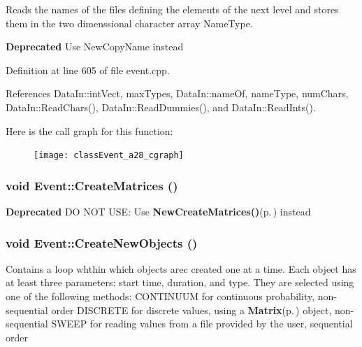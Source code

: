 Reads the names of the files defining the elements of the next level and stores them in the two dimenssional character array Name\-Type. 

\begin{Desc}
\item[{\bf Deprecated}]Use New\-Copy\-Name instead \end{Desc}


Definition at line 605 of file event.cpp.

References Data\-In::int\-Vect, max\-Types, Data\-In::name\-Of, name\-Type, num\-Chars, Data\-In::Read\-Chars(), Data\-In::Read\-Dummies(), and Data\-In::Read\-Ints().

Here is the call graph for this function:\begin{figure}[H]
\begin{center}
\leavevmode
\texttt{[image: classEvent\_a28\_cgraph]}
\end{center}
\end{figure}
\subsubsection{\setlength{\rightskip}{0pt plus 5cm}void Event::Create\-Matrices ()}\label{classEvent_a50}


\begin{Desc}
\item[{\bf Deprecated}]DO NOT USE: Use {\bf New\-Create\-Matrices()}{\rm (p.\,\pageref{classEvent_a51})} instead \end{Desc}
\subsubsection{\setlength{\rightskip}{0pt plus 5cm}void Event::Create\-New\-Objects ()}\label{classEvent_a22}


Contains a loop whthin which objects arec created one at a time. Each object has at least three parameters: start time, duration, and type. They are selected using one of the following methods: CONTINUUM for continuous probability, non-sequential order DISCRETE for discrete values, using a {\bf Matrix}{\rm (p.\,\pageref{classMatrix})} object, non-sequential SWEEP for reading values from a file provided by the user, sequential order 

